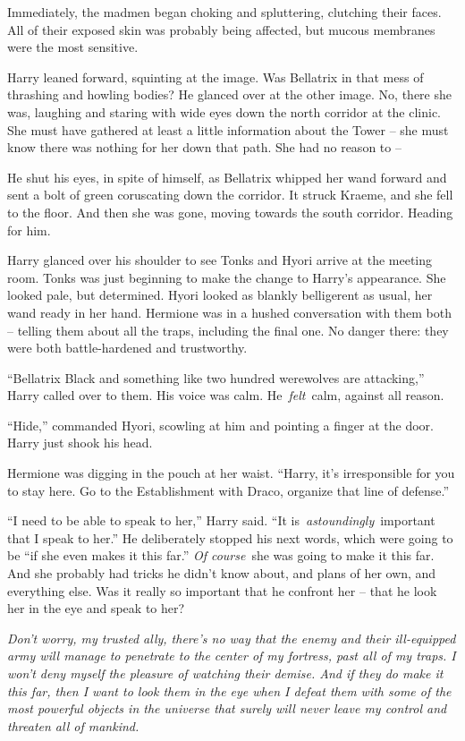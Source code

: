 Immediately, the madmen began choking and spluttering, clutching their
faces. All of their exposed skin was probably being affected, but mucous
membranes were the most sensitive.

Harry leaned forward, squinting at the image. Was Bellatrix in that mess
of thrashing and howling bodies? He glanced over at the other image. No,
there she was, laughing and staring with wide eyes down the north
corridor at the clinic. She must have gathered at least a little
information about the Tower -- she must know there was nothing for her
down that path. She had no reason to --

He shut his eyes, in spite of himself, as Bellatrix whipped her wand
forward and sent a bolt of green coruscating down the corridor. It
struck Kraeme, and she fell to the floor. And then she was gone, moving
towards the south corridor. Heading for him.

Harry glanced over his shoulder to see Tonks and Hyori arrive at the
meeting room. Tonks was just beginning to make the change to Harry's
appearance. She looked pale, but determined. Hyori looked as blankly
belligerent as usual, her wand ready in her hand. Hermione was in a
hushed conversation with them both -- telling them about all the traps,
including the final one. No danger there: they were both battle-hardened
and trustworthy.

``Bellatrix Black and something like two hundred werewolves are
attacking,'' Harry called over to them. His voice was calm.
He~\emph{felt}~calm, against all reason.

``Hide,'' commanded Hyori, scowling at him and pointing a finger at the
door. Harry just shook his head.

Hermione was digging in the pouch at her waist. ``Harry, it's
irresponsible for you to stay here. Go to the Establishment with Draco,
organize that line of defense.''

``I need to be able to speak to her,'' Harry said. ``It
is~\emph{astoundingly}~important that I speak to her.'' He deliberately
stopped his next words, which were going to be ``if she even makes it
this far.'' \emph{Of course}~she was going to make it this far. And she
probably had tricks he didn't know about, and plans of her own, and
everything else. Was it really so important that he confront her -- that
he look her in the eye and speak to her?

\emph{Don't worry, my trusted ally, there's no way that the enemy and
their ill-equipped army will manage to penetrate to the center of my
fortress, past all of my traps. I won't deny myself the pleasure of
watching their demise. And if they do make it this far, then I want to
look them in the eye when I defeat them with some of the most powerful
objects in the universe that surely will never leave my control and
threaten all of mankind.}

